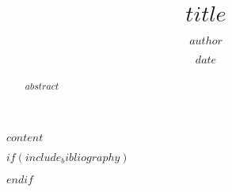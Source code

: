 \documentclass{article}
\title{$title$}
\author{$author$}
\date{$date$}
\begin{document}
\maketitle

\begin{abstract}
$abstract$
\end{abstract}

$content$

$if(include_bibliography)$


$endif$
\end{document}
